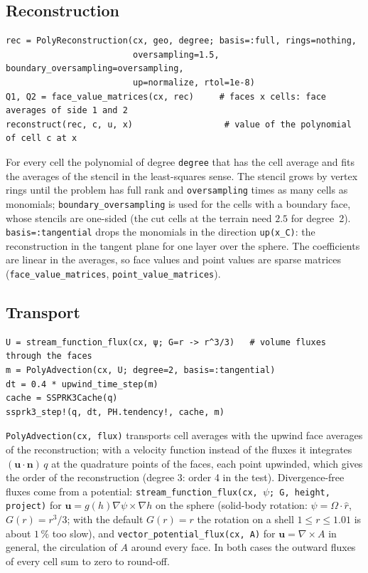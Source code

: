 \documentclass[11pt,a4paper]{article}
\newcommand{\code}[1]{\texttt{#1}}
\newcommand{\bn}{\mathbf{n}}
\newcommand{\bu}{\mathbf{u}}
\begin{document}
\subsection{Reconstruction}
\begin{lstlisting}
rec = PolyReconstruction(cx, geo, degree; basis=:full, rings=nothing,
                         oversampling=1.5, boundary_oversampling=oversampling,
                         up=normalize, rtol=1e-8)
Q1, Q2 = face_value_matrices(cx, rec)     # faces x cells: face averages of side 1 and 2
reconstruct(rec, c, u, x)                  # value of the polynomial of cell c at x
\end{lstlisting}
For every cell the polynomial of degree \code{degree} that has the cell average and fits the
averages of the stencil in the least-squares sense. The stencil grows by vertex rings until the
problem has full rank and \code{oversampling} times as many cells as monomials;
\code{boundary\_oversampling} is used for the cells with a boundary face, whose stencils are
one-sided (the cut cells at the terrain need $2.5$ for degree~2). \code{basis=:tangential} drops
the monomials in the direction \code{up(x\_C)}: the reconstruction in the tangent plane for one layer
over the sphere. The coefficients are linear in the averages, so face values and point values are
sparse matrices (\code{face\_value\_matrices}, \code{point\_value\_matrices}).

\subsection{Transport}
\begin{lstlisting}
U = stream_function_flux(cx, ψ; G=r -> r^3/3)   # volume fluxes through the faces
m = PolyAdvection(cx, U; degree=2, basis=:tangential)
dt = 0.4 * upwind_time_step(m)
cache = SSPRK3Cache(q)
ssprk3_step!(q, dt, PH.tendency!, cache, m)
\end{lstlisting}
\code{PolyAdvection(cx, flux)} transports cell averages with the upwind face averages of the
reconstruction; with a velocity function instead of the fluxes it integrates $(\bu\cdot\bn)\,q$ at the
quadrature points of the faces, each point upwinded, which gives the order of the reconstruction
(degree 3: order 4 in the test). Divergence-free fluxes come from a potential:
\code{stream\_function\_flux(cx, $\psi$; G, height, project)} for $\bu = g(h)\nabla\psi\times\nabla h$ on
the sphere (solid-body rotation: $\psi = \Omega\cdot\hat r$, $G(r) = r^3/3$; with the default
$G(r) = r$ the rotation on a shell $1\le r\le 1.01$ is about $1\,\%$ too slow), and
\code{vector\_potential\_flux(cx, A)} for $\bu = \nabla\times A$ in general, the circulation of $A$
around every face. In both cases the outward fluxes of every cell sum to zero to round-off.
\end{document}
